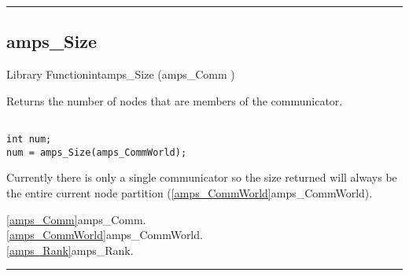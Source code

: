 
\noindent\rule{\textwidth}{1mm}
\subsection{amps\_Size}
\label{amps_Size}


\begin{deftypefn}{Library Function}{int}{amps\_Size}
                 (amps_Comm )

\DESCRIPTION

Returns the number of nodes that are members of the 
communicator.

\EXAMPLE

\begin{display}\begin{verbatim}

int num;
num = amps_Size(amps_CommWorld);

\end{verbatim}\end{display}


\NOTES

Currently there is only a single communicator so the size returned will
always be the entire current node partition (\vref{amps_CommWorld}{amps\_CommWorld}).

\SEEALSO
\vref{amps_Comm}{amps\_Comm}. \\
\vref{amps_CommWorld}{amps\_CommWorld}. \\
\vref{amps_Rank}{amps\_Rank}. \\

\end{deftypefn}


\noindent\rule{\textwidth}{1mm}

